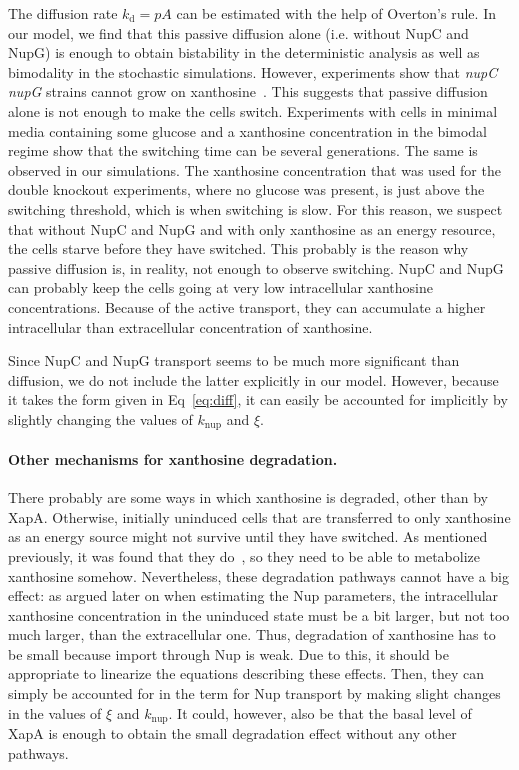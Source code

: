 \documentclass[10pt,letterpaper]{article}
\newcommand{\n}[1]{\mathrm{#1}}
\begin{document}
The diffusion rate $k_{\n{d}} = p A$ can be estimated with the help of Overton's rule. In our model, we find that this passive diffusion alone (i.e. without NupC and NupG) is enough to obtain bistability in the deterministic analysis as well as bimodality in the stochastic simulations. However, experiments show that \textDelta\emph{nupC} \textDelta\emph{nupG} strains cannot grow on xanthosine~\cite{Norholm2001}. This suggests that passive diffusion alone is not enough to make the cells switch. Experiments with cells in minimal media containing some glucose and a xanthosine concentration in the bimodal regime show that the switching time can be several generations. The same is observed in our simulations. The xanthosine concentration that was used for the double knockout experiments, where no glucose was present, is just above the switching threshold, which is when switching is slow. For this reason, we suspect that without NupC and NupG and with only xanthosine as an energy resource, the cells starve before they have switched. This probably is the reason why passive diffusion is, in reality, not enough to observe switching. NupC and NupG can probably keep the cells going at very low intracellular xanthosine concentrations. Because of the active transport, they can accumulate a higher intracellular than extracellular concentration of xanthosine.

Since NupC and NupG transport seems to be much more significant than diffusion, we do not include the latter explicitly in our model. However, because it takes the form given in Eq~\ref{eq:diff}, it can easily be accounted for implicitly by slightly changing the values of $k_{\n{nup}}$ and $\xi$.

\paragraph*{Other mechanisms for xanthosine degradation.}
There probably are some ways in which xanthosine is degraded, other than by XapA. Otherwise, initially uninduced cells that are transferred to only xanthosine as an energy source might not survive until they have switched. As mentioned previously, it was found that they do~\cite{Norholm2001}, so they need to be able to metabolize xanthosine somehow. Nevertheless, these degradation pathways cannot have a big effect: as argued later on when estimating the Nup parameters, the intracellular xanthosine concentration in the uninduced state must be a bit larger, but not too much larger, than the extracellular one. Thus, degradation of xanthosine has to be small because import through Nup is weak. Due to this, it should be appropriate to linearize the equations describing these effects. Then, they can simply be accounted for in the term for Nup transport by making slight changes in the values of $\xi$ and $k_{\n{nup}}$. It could, however, also be that the basal level of XapA is enough to obtain the small degradation effect without any other pathways.
\end{document}
